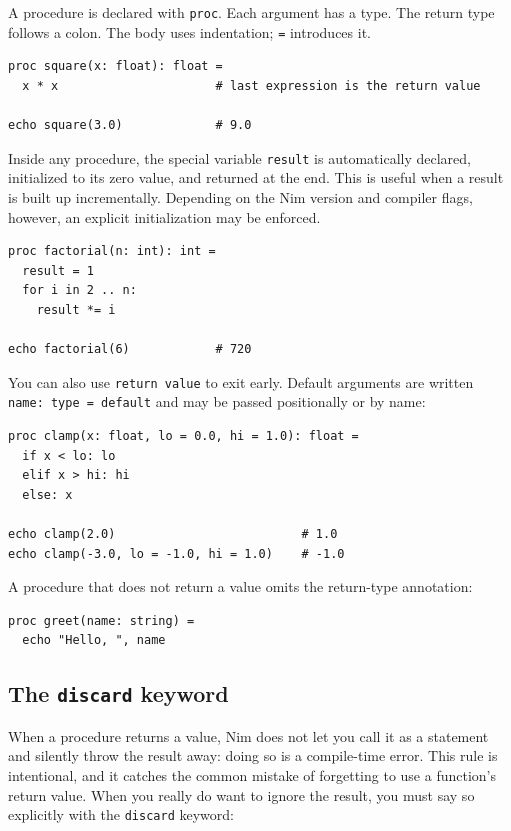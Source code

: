 \documentclass[justified, sixbynine]{tufte-book}
\def\ft{\small\tt}
\theoremstyle{plain}%
\newtheorem * {corollary}{Corollary}
\theoremstyle{definition}
\theoremstyle{remark}
\newtheorem * {remark}{Remark}
\newtheorem * {note}{Note}
\begin{document}
\begin{fullwidth}

A procedure is declared with {\ft proc}. Each argument has a type. The return type follows a colon. The body uses indentation; {\ft =} introduces it.

\begin{lstlisting}
proc square(x: float): float =
  x * x                      # last expression is the return value

echo square(3.0)             # 9.0
\end{lstlisting}

Inside any procedure, the special variable {\ft result} is automatically declared, initialized to its zero value, and returned at the end. This is useful when a result is built up incrementally. Depending on the Nim version and compiler flags, however, an explicit initialization may be enforced.

\begin{lstlisting}
proc factorial(n: int): int =
  result = 1
  for i in 2 .. n:
    result *= i

echo factorial(6)            # 720
\end{lstlisting}

You can also use {\ft return value} to exit early. Default arguments are written {\ft name: type = default} and may be passed positionally or by name:

\begin{lstlisting}
proc clamp(x: float, lo = 0.0, hi = 1.0): float =
  if x < lo: lo
  elif x > hi: hi
  else: x

echo clamp(2.0)                          # 1.0
echo clamp(-3.0, lo = -1.0, hi = 1.0)    # -1.0
\end{lstlisting}

A procedure that does not return a value omits the return-type annotation:

\begin{lstlisting}
proc greet(name: string) =
  echo "Hello, ", name
\end{lstlisting}

\goodbreak\subsection{The {\ft discard} keyword}


When a procedure returns a value, Nim does not let you call it as a statement and silently throw the result away: doing so is a compile-time error. This rule is intentional, and it catches the common mistake of forgetting to use a function's return value. When you really do want to ignore the result, you must say so explicitly with the {\ft discard} keyword:


\end{fullwidth}
\end{document}
